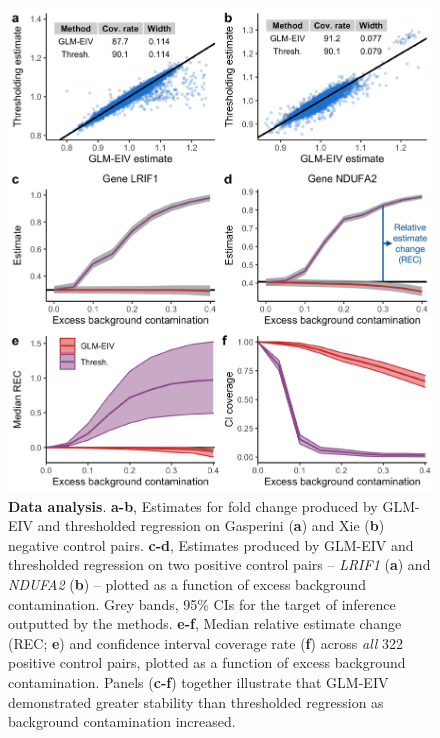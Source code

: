 \documentclass[11pt]{article}
\begin{document}
\clearpage
\begin{figure}
	\centering
	\includegraphics[width=0.9\linewidth]{../../figures/data_analysis/annotated_plot_crop}
	\caption{\textbf{Data analysis}. \textbf{a-b}, Estimates for fold change produced by GLM-EIV and thresholded regression on Gasperini (\textbf{a}) and Xie (\textbf{b}) negative control pairs. \textbf{c-d}, Estimates produced by GLM-EIV and thresholded regression on two positive control pairs -- \textit{LRIF1} (\textbf{a}) and \textit{NDUFA2} (\textbf{b}) -- plotted as a function of excess background contamination. Grey bands, 95\% CIs for the target of inference outputted by the methods. \textbf{e-f}, Median relative estimate change (REC; \textbf{e}) and confidence interval coverage rate (\textbf{f}) across \textit{all} 322 positive control pairs, plotted as a function of excess background contamination. Panels (\textbf{c-f}) together illustrate that GLM-EIV demonstrated greater stability than thresholded regression as background contamination increased.}\label{fig:real_data}
\end{figure}
\end{document}
